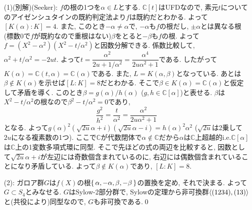 (1)(別解)(Seeker): $f$の根の1つを$\alpha \in L$とする. $\mathbb{C}[t]$はUFDなので, 素元$t$についてのアイゼンシュタインの既約判定法より$f$は既約だとわかる. よって$[K(\alpha) : K]=4$. また, このとき$-\alpha \neq \alpha$で, $-\alpha$も$f$の根だし, $\pm \alpha$とは異なる根(標数0で$f$が既約なので重根はない)$\beta$をとると$-\beta$も$f$の根. よって$f = (X^2 - \alpha^2)(X^2 - t/ \alpha^2)$と因数分解できる. 係数比較して, $\alpha^2 + t/\alpha^2 = -2ut$. よって$t= \dfrac{\alpha^2}{2u+1/\alpha^2} = \dfrac{\alpha^4}{2u\alpha^2 + 1}$である. したがって$K(\alpha) = \mathbb{C}(t, \alpha) = \mathbb{C}(\alpha)$である. また, $L=K(\alpha , \beta)$となっている. あとは$\beta \notin K(\alpha)$を示せば$[L:K] = 8$だとわかる. そこで$\beta \in K(\alpha)=\mathbb{C}(\alpha)$と仮定して矛盾を導く. このとき$\beta = g(\alpha)/h(\alpha)$ ($g, h\in \mathbb{C}[\alpha]$)と表せる.  $\beta $は$X^2-t/\alpha^2$の根なので$\beta^2 -t/\alpha^2=0$であり,
    \[
    \frac{g^2}{h^2} = \frac{t}{\alpha^2}
    =\frac{\alpha^2}{2u\alpha^2 + 1}
    \]
となる. よって$g(\alpha)^2 (\sqrt{2u}\alpha + i)(\sqrt{2u}\alpha-i) = h(\alpha)^2\alpha^2$ ($\sqrt{2u}$は2乗して$2u$になる複素数の1つ). ここで$\mathbb{C}$が代数閉体で$\alpha \notin \mathbb{C}$だから$\alpha$は$\mathbb{C}$上超越的i.e.$\mathbb{C}[\alpha]$は$\mathbb{C}$上の1変数多項式環に同型. そこで先ほどの式の両辺を比較すると, 因数として$\sqrt{2u}\alpha +i$が左辺には奇数個含まれているのに, 右辺には偶数個含まれていることになり矛盾している. よって$\beta\notin K(\alpha)$であり, $[L:K] = 8$.

(2): ガロア群$G$は$f(X)$の根$\set{\alpha,-\alpha,\beta,-\beta}$の置換を定め, それで決まる. よって $G\subset S_4$とみなせる. $G$はSylow-2部分群で, Sylowの定理から非可換群$\langle (1234), (13)\rangle$と(共役により)同型なので, $G$も非可換である.\qed


